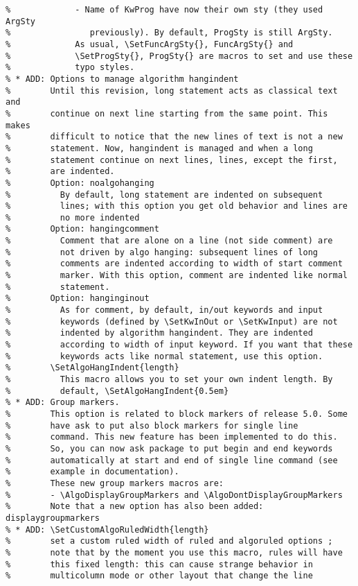 \documentclass[a4paper]{article}
\begin{document}
\begin{verbatim}
%             - Name of KwProg have now their own sty (they used ArgSty
%                previously). By default, ProgSty is still ArgSty.
%             As usual, \SetFuncArgSty{}, FuncArgSty{} and
%             \SetProgSty{}, ProgSty{} are macros to set and use these
%             typo styles.
% * ADD: Options to manage algorithm hangindent
%        Until this revision, long statement acts as classical text and
%        continue on next line starting from the same point. This makes
%        difficult to notice that the new lines of text is not a new
%        statement. Now, hangindent is managed and when a long
%        statement continue on next lines, lines, except the first,
%        are indented.
%        Option: noalgohanging
%          By default, long statement are indented on subsequent
%          lines; with this option you get old behavior and lines are
%          no more indented
%        Option: hangingcomment 
%          Comment that are alone on a line (not side comment) are
%          not driven by algo hanging: subsequent lines of long
%          comments are indented according to width of start comment
%          marker. With this option, comment are indented like normal
%          statement.
%        Option: hanginginout
%          As for comment, by default, in/out keywords and input
%          keywords (defined by \SetKwInOut or \SetKwInput) are not
%          indented by algorithm hangindent. They are indented
%          according to width of input keyword. If you want that these
%          keywords acts like normal statement, use this option.
%        \SetAlgoHangIndent{length}
%          This macro allows you to set your own indent length. By
%          default, \SetAlgoHangIndent{0.5em}
% * ADD: Group markers. 
%        This option is related to block markers of release 5.0. Some
%        have ask to put also block markers for single line
%        command. This new feature has been implemented to do this.
%        So, you can now ask package to put begin and end keywords
%        automatically at start and end of single line command (see
%        example in documentation).
%        These new group markers macros are:
%        - \AlgoDisplayGroupMarkers and \AlgoDontDisplayGroupMarkers
%        Note that a new option has also been added: displaygroupmarkers
% * ADD: \SetCustomAlgoRuledWidth{length}
%        set a custom ruled width of ruled and algoruled options ;
%        note that by the moment you use this macro, rules will have
%        this fixed length: this can cause strange behavior in
%        multicolumn mode or other layout that change the line

\end{verbatim}
\end{document}
